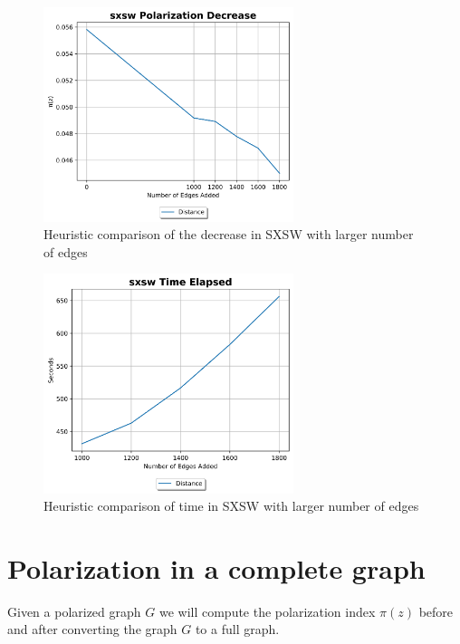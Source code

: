 \clearpage

\begin{figure}[H]
	\centering
	\includegraphics[width=0.65\textwidth]{Figures/sxsw Polarization Decrease 2}
	\caption{Heuristic comparison of the decrease in SXSW with larger number of edges}
	\label{fig:sxsw_pol}
\end{figure}


\begin{figure}[H]
	\centering
	\includegraphics[width=0.65\textwidth]{Figures/sxsw Time Elapsed 2}
	\caption{Heuristic comparison of time in SXSW with larger number of edges}
	\label{fig:sxsw_time}
\end{figure}


\clearpage

\section{Polarization in a complete graph}
\label{sec:fullgraph}
\vspace{20pt}
Given a polarized graph $G$ we will compute the polarization index $\pi(z)$ before and after converting the graph $G$ to a full graph. 

